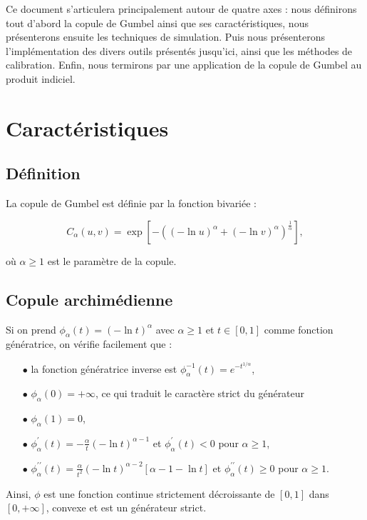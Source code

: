 \documentclass[11pt]{article}
\begin{document}
Ce document s'articulera principalement autour de quatre axes : nous d\'e\-finirons tout d'abord la 
copule de Gumbel ainsi que ses caract\'eristiques, nous pr\'esenterons ensuite les techniques 
de simulation. Puis nous pr\'esenterons l'impl\'ementation des divers outils pr\'esent\'es jusqu'ici, ainsi
que les m\'ethodes de calibration. Enfin, nous termirons par une application de la copule de Gumbel
au produit indiciel.

\section{Caract\'eristiques}

\subsection{D\'efinition}

La copule de Gumbel est d\'efinie par la fonction bivari\'ee :

$$C_\alpha\left(u,v\right)=\exp\left[-\left(\left(-\ln u\right)^\alpha+\left(-\ln v\right)^\alpha\right)^{\frac{1}{\alpha}}\right],$$

o\`u $\alpha\geq1$ est le param\`etre de la copule.

\subsection{Copule archim\'edienne}
Si on prend $\phi_\alpha(t)=\left(-\ln t\right)^\alpha$ avec $\alpha\geq1$ et $t\in [0,1]$ comme fonction g\'en\'eratrice, on v\'erifie facilement que :

\begin{itemize}
\item[]
\item[$\bullet$] la fonction g\'en\'eratrice inverse est $\phi_\alpha^{-1}(t)=e^{-t^{1/\alpha}}$,
\item[]
\item[$\bullet$] $\phi_\alpha(0)=+\infty$, ce qui traduit le caract\`ere strict du g\'en\'erateur
\item[]
\item[$\bullet$] $\phi_\alpha(1)=0$,
\item[]
\item[$\bullet$] $\phi_\alpha^\prime(t)=-\frac{\alpha}{t}(-\ln t)^{\alpha-1}$ et $\phi_\alpha^\prime(t)<0$ pour $\alpha\geq1$,
\item[]
\item[$\bullet$] $\phi_\alpha^{\prime\prime}(t)=\frac{\alpha}{t^2}(-\ln t)^{\alpha-2}\left[\alpha-1-\ln t\right]$ et $\phi_\alpha^{\prime\prime}(t)\geq0$ pour $\alpha\geq1$.
\item[]
\end{itemize}
Ainsi, $\phi$ est une fonction continue strictement d\'ecroissante de $[0,1]$ dans $[0,+\infty]$, convexe et est un
g\'en\'erateur strict.
\end{document}
